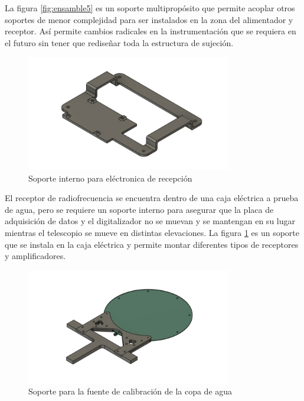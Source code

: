 La figura \ref{fig:ensamble5} es un soporte multipropósito que permite acoplar otros soportes de menor complejidad para ser instalados en la zona del alimentador y receptor. Así permite cambios radicales en la instrumentación que se requiera en el futuro sin tener que rediseñar toda la estructura de sujeción.\\

\begin{figure}
    \centering
    \includegraphics[width=0.8\textwidth]{img/soporte3D7}
    \caption{Soporte interno para eléctronica de recepción}
    \label{fig:ensamble6}
\end{figure}

El receptor de radiofrecuencia se encuentra dentro de una caja eléctrica a prueba de agua, pero se requiere un soporte interno para asegurar que la placa de adquisición de datos y el digitalizador no se muevan y se mantengan en su lugar mientras el telescopio se mueve en distintas elevaciones. La figura \ref{fig:ensamble6} es un soporte que se instala en la caja eléctrica y permite montar diferentes tipos de receptores y amplificadores.\\

\begin{figure}
    \centering
    \includegraphics[width=0.8\textwidth]{img/soporte3D4}
    \caption{Soporte para la fuente de calibración de la copa de agua }
    \label{fig:ensamble7}
\end{figure}

